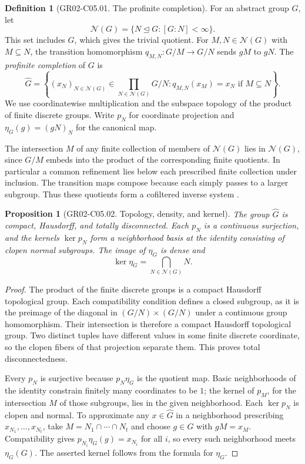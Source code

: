 \documentclass[11pt,oneside,openany]{book}
\newtheorem{proposition}[theorem]{Proposition}
\theoremstyle{definition}
\newtheorem{definition}[theorem]{Definition}
\theoremstyle{remark}
\begin{document}
\begin{definition}[GR02-C05.01. The profinite completion]
\label{def:gr02-completion}
For an abstract group \(G\), let
\[
  \mathcal N(G)=\{N\trianglelefteq G:[G:N]<\infty\}.
\]
This set includes \(G\), which gives the trivial quotient. For
\(M,N\in\mathcal N(G)\) with \(M\subseteq N\), the transition
homomorphism \(q_{M,N}\colon G/M\to G/N\) sends \(gM\) to \(gN\).
The \emph{profinite completion} of \(G\) is
\[
  \widehat G
  =\left\{(x_N)_{N\in\mathcal N(G)}\in\prod_{N\in\mathcal N(G)}G/N
          :q_{M,N}(x_M)=x_N\text{ if }M\subseteq N\right\}.
\]
We use coordinatewise multiplication and the subspace topology of the
product of finite discrete groups. Write \(p_N\) for coordinate
projection and \(\eta_G(g)=(gN)_N\) for the canonical map.
\end{definition}

The intersection \(M\) of any finite collection of members of
\(\mathcal N(G)\) lies in \(\mathcal N(G)\), since \(G/M\) embeds into
the product of the corresponding finite quotients. In particular a
common refinement lies below each prescribed finite collection under
inclusion. The transition maps compose because each simply passes to
a larger subgroup. Thus these quotients form a cofiltered inverse
system \cite[Definition 1.2.1 and Section 1.2]{profinite-source}.

\begin{proposition}[GR02-C05.02. Topology, density, and kernel]
\label{prop:gr02-completion-topology}
The group \(\widehat G\) is compact, Hausdorff, and totally
disconnected. Each \(p_N\) is a continuous surjection, and the kernels
\(\ker p_N\) form a neighborhood basis at the identity consisting of
clopen normal subgroups. The image of \(\eta_G\) is dense and
\[
     \ker\eta_G=\bigcap_{N\in\mathcal N(G)}N .
\]
\end{proposition}

\begin{proof}
The product of the finite discrete groups is a compact Hausdorff
topological group. Each compatibility condition defines a closed
subgroup, as it is the preimage of the diagonal in
\((G/N)\times(G/N)\) under a continuous group homomorphism. Their
intersection is therefore a compact Hausdorff topological group.
Two distinct tuples have different values in some finite discrete
coordinate, so the clopen fibers of that projection separate them.
This proves total disconnectedness.

Every \(p_N\) is surjective because \(p_N\eta_G\) is the quotient
map. Basic neighborhoods of the identity constrain finitely many
coordinates to be \(1\); the kernel of \(p_M\), for the intersection
\(M\) of those subgroups, lies in the given neighborhood. Each
\(\ker p_N\) is clopen and normal. To approximate any
\(x\in\widehat G\) in a neighborhood prescribing \(x_{N_1},\ldots,x_{N_t}\),
take \(M=N_1\cap\cdots\cap N_t\) and choose \(g\in G\) with
\(gM=x_M\). Compatibility gives \(p_{N_i}\eta_G(g)=x_{N_i}\) for all
\(i\), so every such neighborhood meets \(\eta_G(G)\).
The asserted kernel follows from the formula for \(\eta_G\).
\end{proof}
\end{document}
